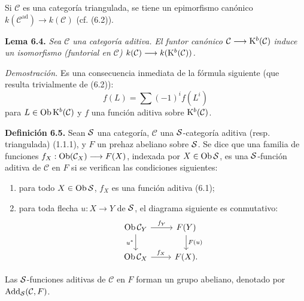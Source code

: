 Si \(\mathcal C\) es una categoría triangulada, se tiene un epimorfismo canónico \(k(\mathcal C^{\mathrm{ad}})\longrightarrow k(\mathcal C)\) (cf. (6.2)).

\textbf{Lema 6.4.} \emph{Sea \(\mathcal C\) una categoría aditiva. El funtor canónico \(\mathcal C\longrightarrow\Kpx^b(\mathcal C)\) induce un isomorfismo (funtorial en \(\mathcal C\)) \(k(\mathcal C)\longrightarrow k(\Kpx^b(\mathcal C))\).}

\emph{Demostración.} Es una consecuencia inmediata de la fórmula siguiente (que resulta trivialmente de (6.2)):
\begin{equation}\tag{6.4.1}
  f(L)=\sum (-1)^i f(L^i)
\end{equation}
para \(L\in\Ob\Kpx^b(\mathcal C)\) y \(f\) una función aditiva sobre \(\Kpx^b(\mathcal C)\).

\textbf{Definición 6.5.} Sean \(\sisi{S}{\mathcal S}\) una categoría, \(\mathcal C\) una \(\sisi{S}{\mathcal S}\)-categoría aditiva (resp. triangulada) (1.1.1), y \(F\) un prehaz abeliano sobre \(\sisi{S}{\mathcal S}\). Se dice que una familia de funciones \(f_X:\Ob(\mathcal C_X)\longrightarrow F(X)\), indexada por \(X\in\Ob \sisi{S}{\mathcal S}\), es una \(\sisi{S}{\mathcal S}\)-función aditiva de \(\mathcal C\) en \(F\) si se verifican las condiciones siguientes:
\begin{enumerate}[label=(\roman*)]
\item para todo \(X\in\sisi{\Ob\mathcal C_X}{\Ob\mathcal S}\), \(f_X\) es una función aditiva (6.1);
\item para toda flecha \(u:X\to Y\) de \(\sisi{S}{\mathcal S}\), el diagrama siguiente es conmutativo:
\[
\begin{tikzcd}
\Ob\mathcal C_Y \arrow[r,"f_Y"] \arrow[d,"u^*"'] & F(Y) \arrow[d,"F(u)"]\\
\Ob\mathcal C_X \arrow[r,"f_X"] & F(X).
\end{tikzcd}
\]
\end{enumerate}
Las \(\sisi{S}{\mathcal S}\)-funciones aditivas de \(\mathcal C\) en \(F\) forman un grupo abeliano, denotado por \(\Add\sisi{_S}{_{\mathcal S}}(\mathcal C,F)\).

